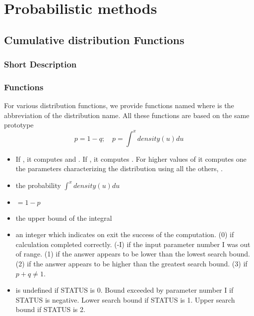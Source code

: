 \section{Probabilistic methods}
\subsection{Cumulative distribution Functions}
\subsubsection{Short Description}
\subsubsection*{Functions}



For various distribution functions, we provide functions named
 where  is the abbreviation of the distribution
name. All these functions are based on the same prototype
\begin{equation*}
  p = 1-q; \quad p = \int^x density(u) du
\end{equation*}

\begin{itemize}
\item {} If , it computes  and . If
  , it computes . For higher values of  it
  computes one the parameters characterizing the distribution using all the
  others, .
\item {} the probability $\int^x density(u) du $
\item {} $= 1 - p$
\item {} the upper bound of the integral
\item {} an integer which indicates on exit the success of the
  computation. (0) if calculation completed correctly. (-I) if the input
  parameter number I was out of range. (1) if the answer appears to be lower
  than the lowest search bound.  (2) if the answer appears to be higher than
  the greatest search bound.  (3) if $p + q \ne 1$.
\item {} is undefined if STATUS is 0.  Bound exceeded by parameter
  number I if STATUS is negative. Lower search bound if STATUS is 1.  Upper
  search bound if STATUS is 2.
\end{itemize}


